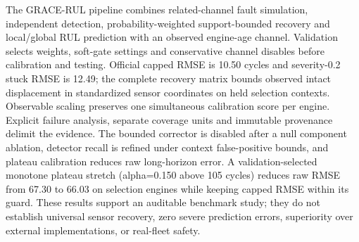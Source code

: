 The GRACE-RUL pipeline combines related-channel fault simulation, independent detection, probability-weighted support-bounded recovery and local/global RUL prediction with an observed engine-age channel. Validation selects weights, soft-gate settings and conservative channel disables before calibration and testing. Official capped RMSE is 10.50 cycles and severity-0.2 stuck RMSE is 12.49; the complete recovery matrix bounds observed intact displacement in standardized sensor coordinates on held selection contexts. Observable scaling preserves one simultaneous calibration score per engine. Explicit failure analysis, separate coverage units and immutable provenance delimit the evidence. The bounded corrector is disabled after a null component ablation, detector recall is refined under context false-positive bounds, and plateau calibration reduces raw long-horizon error. A validation-selected monotone plateau stretch (alpha=0.150 above 105 cycles) reduces raw RMSE from 67.30 to 66.03 on selection engines while keeping capped RMSE within its guard. These results support an auditable benchmark study; they do not establish universal sensor recovery, zero severe prediction errors, superiority over external implementations, or real-fleet safety.
